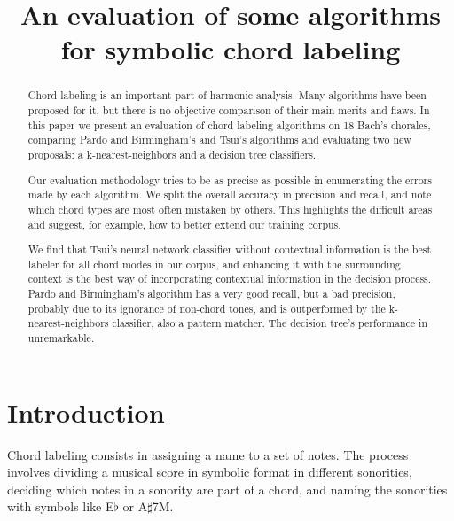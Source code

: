 \documentclass{article}
\title{An evaluation of some algorithms for symbolic chord labeling}
\begin{document}
\graphicspath{{figs/}{data/}}
\maketitle

\begin{abstract}

  Chord labeling is an important part of harmonic analysis. Many
  algorithms have been proposed for it, but there is no objective
  comparison of their main merits and flaws. In this paper we present
  an evaluation of chord labeling algorithms on 18 Bach's chorales,
  comparing Pardo and Birmingham's and Tsui's algorithms and
  evaluating two new proposals: a k-nearest-neighbors and a decision
  tree classifiers.
  
  Our evaluation methodology tries to be as precise as possible in
  enumerating the errors made by each algorithm. We split the overall
  accuracy in precision and recall, and note which chord types are
  most often mistaken by others. This highlights the difficult areas
  and suggest, for example, how to better extend our training
  corpus. 
  
  We find that Tsui's neural network classifier without contextual
  information is the best labeler for all chord modes in our corpus,
  and enhancing it with the surrounding context is the best way of
  incorporating contextual information in the decision process. Pardo
  and Birmingham's algorithm has a very good recall, but a bad
  precision, probably due to its ignorance of non-chord tones, and is
  outperformed by the k-nearest-neighbors classifier, also a pattern
  matcher. The decision tree's performance in unremarkable.
\end{abstract}

\section{Introduction}
\label{sec:introduction}

Chord labeling consists in assigning a name to a set of notes. The
process involves dividing a musical score in symbolic format in
different sonorities, deciding which notes in a sonority are part of a
chord, and naming the sonorities with symbols like E$\flat$ or
A$\sharp$7M.
\end{document}
